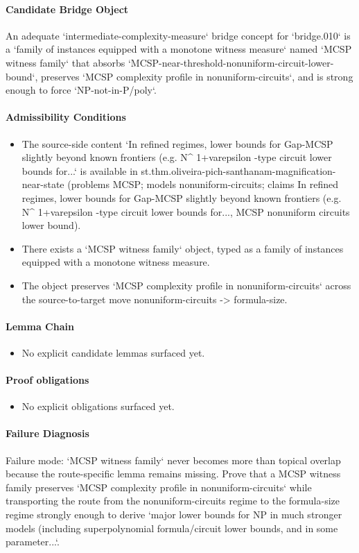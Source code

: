 \documentclass[11pt]{article}
\begin{document}
\paragraph{Candidate Bridge Object}
An adequate `intermediate-complexity-measure` bridge concept for `bridge.010` is a `family of instances equipped with a monotone witness measure` named `MCSP witness family` that absorbs `MCSP-near-threshold-nonuniform-circuit-lower-bound`, preserves `MCSP complexity profile in nonuniform-circuits`, and is strong enough to force `NP-not-in-P/poly`.
\paragraph{Admissibility Conditions}
\begin{itemize}
\item The source-side content `In refined regimes, lower bounds for Gap-MCSP slightly beyond known frontiers (e.g. N\textasciicircum{} 1+varepsilon -type circuit lower bounds for...` is available in st.thm.oliveira-pich-santhanam-magnification-near-state (problems MCSP; models nonuniform-circuits; claims In refined regimes, lower bounds for Gap-MCSP slightly beyond known frontiers (e.g. N\textasciicircum{} 1+varepsilon -type circuit lower bounds for..., MCSP nonuniform circuits lower bound).
\item There exists a `MCSP witness family` object, typed as a family of instances equipped with a monotone witness measure.
\item The object preserves `MCSP complexity profile in nonuniform-circuits` across the source-to-target move nonuniform-circuits -> formula-size.
\end{itemize}
\paragraph{Lemma Chain}
\begin{itemize}
\item No explicit candidate lemmas surfaced yet.
\end{itemize}
\paragraph{Proof obligations}
\begin{itemize}
\item No explicit obligations surfaced yet.
\end{itemize}
\paragraph{Failure Diagnosis}
Failure mode: `MCSP witness family` never becomes more than topical overlap because the route-specific lemma remains missing. Prove that a MCSP witness family preserves `MCSP complexity profile in nonuniform-circuits` while transporting the route from the nonuniform-circuits regime to the formula-size regime strongly enough to derive `major lower bounds for NP in much stronger models (including superpolynomial formula/circuit lower bounds, and in some parameter...`.
\end{document}
